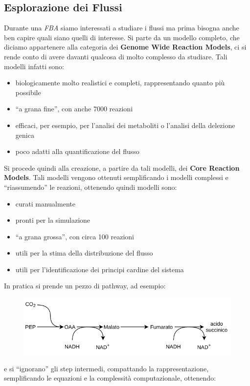 \documentclass[a4paper,12pt, oneside]{book}
\begin{document}
\subsection{Esplorazione dei Flussi}
Durante una \textit{FBA} siamo interessati a studiare i flussi ma prima bisogna
anche ben capire quali siano quelli di interesse. Si parte da un modello
completo, che diciamo appartenere alla categoria dei \textbf{Genome Wide
  Reaction Models}, ci si rende conto di avere davanti qualcosa di molto
complesso da studiare. Tali modelli infatti sono:
\begin{itemize}
  \item biologicamente molto realistici e completi, rappresentando quanto più
  possibile
  \item ``a grana fine'', con anche 7000 reazioni
  \item efficaci, per esempio, per l'analisi dei metaboliti o l'analisi
  della delezione genica 
  \item poco adatti alla quantificazione del flusso 
\end{itemize}
Si procede quindi alla creazione, a partire da tali modelli, dei
\textbf{Core Reaction Models}. Tali modelli vengono ottenuti semplificando i
modelli complessi e ``riassumendo'' le reazioni, ottenendo quindi modelli sono:
\begin{itemize}
  \item curati manualmente
  \item pronti per la simulazione
  \item ``a grana grossa'', con circa 100 reazioni
  \item utili per la stima della distribuzione del flusso
  \item utili per l'identificazione dei principi cardine del sistema
\end{itemize}
In pratica si prende un pezzo di pathway, ad esempio:
\begin{figure}[H]
  \centering
  \includegraphics[scale = 0.85]{img/lr1.pdf}
\end{figure}
e si ``ignorano'' gli step intermedi, compattando la rappresentazione,
semplificando le equazioni e la complessità computazionale, ottenendo:
\end{document}
